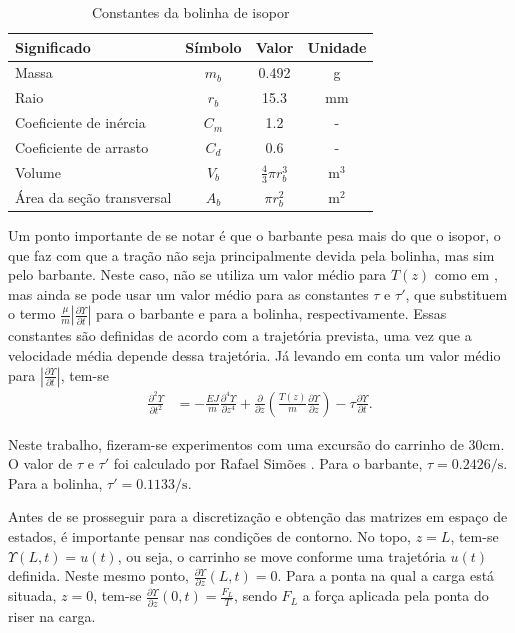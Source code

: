 \begin{table}[!ht]
	\centering
	\caption{Constantes da bolinha de isopor\label{constanteIsopor}}
	\begin{tabular}{|l|c|c|c|}
		\hline
		\textbf{Significado} & \textbf{Símbolo} & \textbf{Valor} & \textbf{Unidade}\\ \hline \hline
		Massa & $m_{b}$ & 0.492 & g\\ \hline
		Raio & $r_{b}$ & 15.3 & mm\\ \hline
		Coeficiente de inércia & $C_m$ & 1.2 & - \\ \hline
		Coeficiente de arrasto & $C_d$ & 0.6 & - \\ \hline
		Volume & $V_b$ & $\frac{4}{3}\pi r_b^3$ & $\textrm{m}^3$ \\ \hline
		Área da seção transversal & $A_b$ & $\pi r_b^2$ & m$^2$\\ \hline
	\end{tabular}
	
\end{table}

 Um ponto importante de se notar é que o barbante pesa mais do que o isopor, o que faz com que a tração não seja principalmente devida pela bolinha, mas sim pelo barbante. Neste caso, não se utiliza um valor médio para $T(z)$ como em \cite{fabricioIFAC}, mas ainda se pode usar um valor médio para as constantes $\tau$ e $\tau'$, que substituem o termo $\frac{\mu}{m}\left|\frac{\partial \Upsilon}{\partial t}\right|$ para o barbante e para a bolinha, respectivamente. Essas constantes são definidas de acordo com a trajetória prevista, uma vez que a velocidade média depende dessa trajetória. Já levando em conta um valor médio para $\left|\frac{\partial \Upsilon}{\partial t}\right|$, tem-se \begin{align}
	\frac{\partial^2 \Upsilon}{\partial t^2} &= -\frac{EJ}{m}\frac{\partial^4 \Upsilon}{\partial z^4} + \frac{\partial}{\partial z}\left(\frac{T(z)}{m}\frac{\partial \Upsilon}{\partial z}\right) - \tau\frac{\partial \Upsilon}{\partial t}.\label{EquacaoComTau}
	\end{align}

 Neste trabalho, fizeram-se experimentos com uma excursão do carrinho de 30cm. O valor de $\tau$ e $\tau'$ foi calculado por Rafael Simões \cite{rafaelMestrado}. Para o barbante, $\tau = 0.2426/\mathrm{s}$. Para a bolinha, $\tau'=0.1133/\mathrm{s}$.
 
 Antes de se prosseguir para a discretização e obtenção das matrizes em espaço de estados, é importante pensar nas condições de contorno. No topo, $z=L$, tem-se $\Upsilon(L,t)=u(t)$, ou seja, o carrinho se move conforme uma trajetória $u(t)$ definida. Neste mesmo ponto, $\frac{\partial\Upsilon}{\partial z}(L,t) = 0$. Para a ponta na qual a carga está situada, $z=0$, tem-se $\frac{\partial\Upsilon}{\partial z}(0,t) = \frac{F_L}{T}$, sendo $F_L$ a força aplicada pela ponta do riser na carga.

